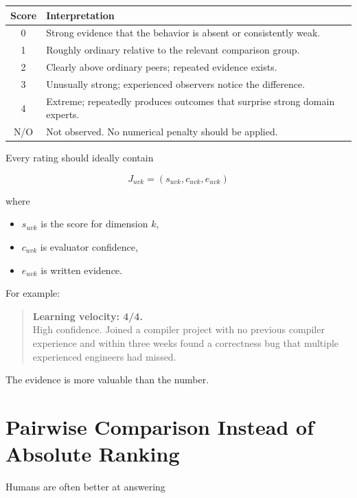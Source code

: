 \documentclass[11pt]{article}
\begin{document}
\begin{center}
\begin{tabularx}{\textwidth}{c X}
\toprule
Score & Interpretation \\
\midrule
0 & Strong evidence that the behavior is absent or consistently weak. \\
1 & Roughly ordinary relative to the relevant comparison group. \\
2 & Clearly above ordinary peers; repeated evidence exists. \\
3 & Unusually strong; experienced observers notice the difference. \\
4 & Extreme; repeatedly produces outcomes that surprise strong domain experts. \\
N/O & Not observed. No numerical penalty should be applied. \\
\bottomrule
\end{tabularx}
\end{center}

Every rating should ideally contain

\[
J_{uvk} =
(s_{uvk}, c_{uvk}, e_{uvk})
\]

where

\begin{itemize}
    \item \(s_{uvk}\) is the score for dimension \(k\),
    \item \(c_{uvk}\) is evaluator confidence,
    \item \(e_{uvk}\) is written evidence.
\end{itemize}

For example:

\begin{quote}
\textbf{Learning velocity: 4/4.}\\
High confidence. Joined a compiler project with no previous compiler
experience and within three weeks found a correctness bug that multiple
experienced engineers had missed.
\end{quote}

The evidence is more valuable than the number.

\section{Pairwise Comparison Instead of Absolute Ranking}

Humans are often better at answering
\end{document}
